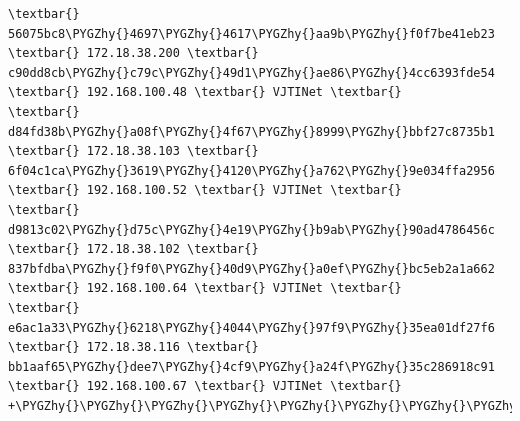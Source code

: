 \documentclass[letterpaper,10pt,english]{sphinxmanual}
\def\PYGZhy{\char`\-}
\begin{document}
\begin{enumerate}
\begin{Verbatim}[commandchars=\\\{\}]
\textbar{} 56075bc8\PYGZhy{}4697\PYGZhy{}4617\PYGZhy{}aa9b\PYGZhy{}f0f7be41eb23 \textbar{} 172.18.38.200 \textbar{} c90dd8cb\PYGZhy{}c79c\PYGZhy{}49d1\PYGZhy{}ae86\PYGZhy{}4cc6393fde54 \textbar{} 192.168.100.48 \textbar{} VJTINet \textbar{}
\textbar{} d84fd38b\PYGZhy{}a08f\PYGZhy{}4f67\PYGZhy{}8999\PYGZhy{}bbf27c8735b1 \textbar{} 172.18.38.103 \textbar{} 6f04c1ca\PYGZhy{}3619\PYGZhy{}4120\PYGZhy{}a762\PYGZhy{}9e034ffa2956 \textbar{} 192.168.100.52 \textbar{} VJTINet \textbar{}
\textbar{} d9813c02\PYGZhy{}d75c\PYGZhy{}4e19\PYGZhy{}b9ab\PYGZhy{}90ad4786456c \textbar{} 172.18.38.102 \textbar{} 837bfdba\PYGZhy{}f9f0\PYGZhy{}40d9\PYGZhy{}a0ef\PYGZhy{}bc5eb2a1a662 \textbar{} 192.168.100.64 \textbar{} VJTINet \textbar{}
\textbar{} e6ac1a33\PYGZhy{}6218\PYGZhy{}4044\PYGZhy{}97f9\PYGZhy{}35ea01df27f6 \textbar{} 172.18.38.116 \textbar{} bb1aaf65\PYGZhy{}dee7\PYGZhy{}4cf9\PYGZhy{}a24f\PYGZhy{}35c286918c91 \textbar{} 192.168.100.67 \textbar{} VJTINet \textbar{}
+\PYGZhy{}\PYGZhy{}\PYGZhy{}\PYGZhy{}\PYGZhy{}\PYGZhy{}\PYGZhy{}\PYGZhy{}\PYGZhy{}\PYGZhy{}\PYGZhy{}\PYGZhy{}\PYGZhy{}\PYGZhy{}\PYGZhy{}\PYGZhy{}\PYGZhy{}\PYGZhy{}\PYGZhy{}\PYGZhy{}\PYGZhy{}\PYGZhy{}\PYGZhy{}\PYGZhy{}\PYGZhy{}\PYGZhy{}\PYGZhy{}\PYGZhy{}\PYGZhy{}\PYGZhy{}\PYGZhy{}\PYGZhy{}\PYGZhy{}\PYGZhy{}\PYGZhy{}\PYGZhy{}\PYGZhy{}\PYGZhy{}+\PYGZhy{}\PYGZhy{}\PYGZhy{}\PYGZhy{}\PYGZhy{}\PYGZhy{}\PYGZhy{}\PYGZhy{}\PYGZhy{}\PYGZhy{}\PYGZhy{}\PYGZhy{}\PYGZhy{}\PYGZhy{}\PYGZhy{}+\PYGZhy{}\PYGZhy{}\PYGZhy{}\PYGZhy{}\PYGZhy{}\PYGZhy{}\PYGZhy{}\PYGZhy{}\PYGZhy{}\PYGZhy{}\PYGZhy{}\PYGZhy{}\PYGZhy{}\PYGZhy{}\PYGZhy{}\PYGZhy{}\PYGZhy{}\PYGZhy{}\PYGZhy{}\PYGZhy{}\PYGZhy{}\PYGZhy{}\PYGZhy{}\PYGZhy{}\PYGZhy{}\PYGZhy{}\PYGZhy{}\PYGZhy{}\PYGZhy{}\PYGZhy{}\PYGZhy{}\PYGZhy{}\PYGZhy{}\PYGZhy{}\PYGZhy{}\PYGZhy{}\PYGZhy{}\PYGZhy{}+\PYGZhy{}\PYGZhy{}\PYGZhy{}\PYGZhy{}\PYGZhy{}\PYGZhy{}\PYGZhy{}\PYGZhy{}\PYGZhy{}\PYGZhy{}\PYGZhy{}\PYGZhy{}\PYGZhy{}\PYGZhy{}\PYGZhy{}\PYGZhy{}+\PYGZhy{}\PYGZhy{}\PYGZhy{}\PYGZhy{}\PYGZhy{}\PYGZhy{}\PYGZhy{}\PYGZhy{}\PYGZhy{}+
\end{Verbatim}

\end{enumerate}
\end{document}

